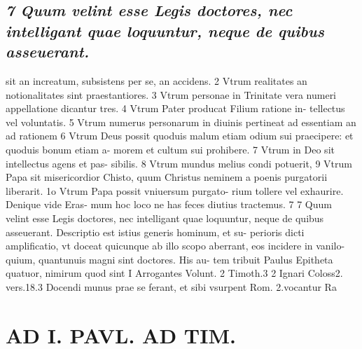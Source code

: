 \documentclass{article}
\begin{document}
\begin{pages}
\subsection*{\textit{7 Quum velint esse Legis doctores, nec intelligant quae loquuntur, neque de quibus asseuerant.}}sit an increatum, subsistens per se, an accidens. 2 Vtrum realitates an notionalitates sint praestantiores. 3 Vtrum personae in Trinitate vera numeri appellatione dicantur tres. 4 Vtrum Pater producat Filium ratione in- tellectus vel voluntatis. 5 Vtrum numerus personarum in diuinis pertineat ad essentiam an ad rationem 6 Vtrum Deus possit quoduis malum etiam odium sui praecipere: et quoduis bonum etiam a- morem et cultum sui prohibere. 7 Vtrum in Deo sit intellectus agens et pas- sibilis. 8 Vtrum mundus melius condi potuerit, 9 Vtrum Papa sit misericordior Chisto, quum Christus neminem a poenis purgatorii liberarit. 1o Vtrum Papa possit vniuersum purgato- rium tollere vel exhaurire. Denique vide Eras- mum hoc loco ne has feces diutius tractemus. 7 7 Quum velint esse Legis doctores, nec intelligant quae loquuntur, neque de quibus asseuerant. Descriptio est istius generis hominum, et su- perioris dicti amplificatio, vt doceat quicunque ab illo scopo aberrant, eos incidere in vanilo- quium, quantunuis magni sint doctores. His au- tem tribuit Paulus Epitheta quatuor, nimirum quod sint I Arrogantes Volunt. 2 Timoth.3 2 Ignari Coloss2. vers.18.3 Docendi munus prae se ferant, et sibi vsurpent Rom. 2.vocantur Ra  \pend
\section*{AD I. PAVL. AD TIM. }
\marginpar{[ p.18 ]}\pstart {}
{}

\end{pages}
\end{document}
